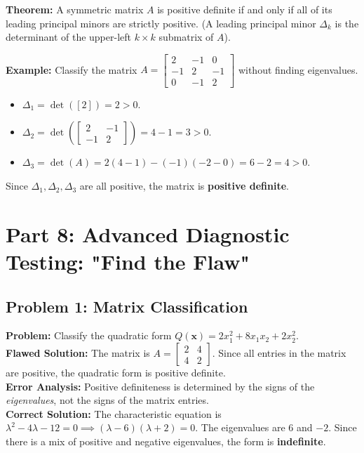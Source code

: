 \documentclass[11pt, letterpaper]{article}
\theoremstyle{definition}
\theoremstyle{remark}
\newcommand{\x}{\mathbf{x}}
\begin{document}
\textbf{Theorem:} A symmetric matrix $A$ is positive definite if and only if all of its leading principal minors are strictly positive. (A leading principal minor $\Delta_k$ is the determinant of the upper-left $k \times k$ submatrix of $A$).

\textbf{Example:} Classify the matrix $A = \begin{bmatrix} 2 & -1 & 0 \\ -1 & 2 & -1 \\ 0 & -1 & 2 \end{bmatrix}$ without finding eigenvalues.
\begin{itemize}
    \item $\Delta_1 = \det([2]) = 2 > 0$.
    \item $\Delta_2 = \det\left(\begin{bmatrix} 2 & -1 \\ -1 & 2 \end{bmatrix}\right) = 4 - 1 = 3 > 0$.
    \item $\Delta_3 = \det(A) = 2(4-1) - (-1)(-2 - 0) = 6 - 2 = 4 > 0$.
\end{itemize}
Since $\Delta_1, \Delta_2, \Delta_3$ are all positive, the matrix is \textbf{positive definite}.

\newpage

\section{Part 8: Advanced Diagnostic Testing: "Find the Flaw"}

\subsection{Problem 1: Matrix Classification}
\textbf{Problem:} Classify the quadratic form $Q(\x) = 2x_1^2 + 8x_1 x_2 + 2x_2^2$. \\
\textbf{Flawed Solution:} The matrix is $A = \begin{bmatrix} 2 & 4 \\ 4 & 2 \end{bmatrix}$. Since all entries in the matrix are positive, the quadratic form is positive definite. \\
\textbf{Error Analysis:} Positive definiteness is determined by the signs of the \textit{eigenvalues}, not the signs of the matrix entries. \\
\textbf{Correct Solution:} The characteristic equation is $\lambda^2 - 4\lambda - 12 = 0 \implies (\lambda - 6)(\lambda + 2) = 0$. The eigenvalues are $6$ and $-2$. Since there is a mix of positive and negative eigenvalues, the form is \textbf{indefinite}.
\end{document}
